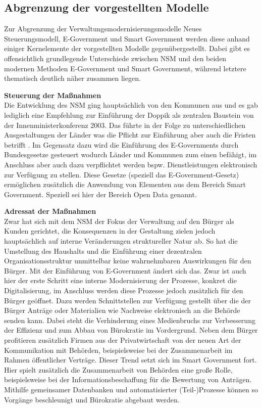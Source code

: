 \subsection{Abgrenzung der vorgestellten Modelle}
Zur Abgrenzung der Verwaltungsmodernisierungsmodelle Neues Steuerungsmodell, E-Government und Smart Government werden diese anhand einiger Kernelemente der vorgestellten Modelle gegenübergestellt.
Dabei gibt es offensichtlich grundlegende Unterschiede zwischen NSM und den beiden \glqq{}modernen\grqq{} Methoden E-Government und Smart Government, während letztere thematisch deutlich näher zusammen liegen.

\textbf{Steuerung der Maßnahmen}\\
Die Entwicklung des NSM ging hauptsächlich von den Kommunen aus und es gab lediglich eine Empfehlung zur Einführung der Doppik als zentralen Baustein von der Innenministerkonferenz 2003.
Das führte in der Folge zu unterschiedlichen Ausgestaltungen der Länder was die Pflicht zur Einführung aber auch die Fristen betrifft \citep[][]{Mehde2019}.
Im Gegensatz dazu wird die Einführung des E-Governments durch Bundesgesetze gesteuert wodurch Länder und Kommunen zum einen befähigt, im Anschluss aber auch dazu verpflichtet werden bspw. Dienstleistungen elektronisch zur Verfügung zu stellen.
Diese Gesetze (speziell das E-Government-Gesetz) ermöglichen zusätzlich die Anwendung von Elementen aus dem Bereich Smart Government.
Speziell sei hier der Bereich Open Data genannt.

\textbf{Adressat der Maßnahmen}\\
Zwar hat sich mit dem NSM der Fokus der Verwaltung auf den Bürger als Kunden gerichtet, die Konsequenzen in der Gestaltung zielen jedoch hauptsächlich auf interne Veränderungen struktureller Natur ab.
So hat die Umstellung des Haushalts und die Einführung einer dezentralen Organisationsstruktur unmittelbar keine wahrnehmbaren Auswirkungen für den Bürger.
Mit der Einführung von E-Government ändert sich das.
Zwar ist auch hier der erste Schritt eine interne Modernisierung der Prozesse, konkret die Digitalisierung, im Anschluss werden diese Prozesse jedoch zusätzlich für den Bürger geöffnet.
Dazu werden Schnittstellen zur Verfügung gestellt über die der Bürger Anträge oder Materialien wie Nachweise elektronisch an die Behörde senden kann.
Dabei steht die Verhinderung eines Medienbruchs zur Verbesserung der Effizienz und zum Abbau von Bürokratie im Vordergrund.
Neben dem Bürger profitieren zusätzlich Firmen aus der Privatwirtschaft von der neuen Art der Kommunikation mit Behörden, beispielsweise bei der Zusammenarbeit im Rahmen öffentlicher Verträge.
Dieser Trend setzt sich im Smart Government fort.
Hier spielt zusätzlich die Zusammenarbeit von Behörden eine große Rolle, beispielsweise bei der Informationsbeschaffung für die Bewertung von Anträgen.
Mithilfe gemeinsamer Datenbanken und automatisierter (Teil-)Prozesse können so Vorgänge beschleunigt und Bürokratie abgebaut werden.

